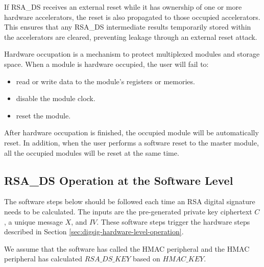 \documentclass[main\_\_EN.tex]{subfiles}
\begin{document}
If RSA\_DS receives an external reset while it has ownership of one or more hardware accelerators, the reset is also propagated to those occupied accelerators. This ensures that any RSA\_DS intermediate results temporarily stored within the accelerators are cleared, preventing leakage through an external reset attack.

\begin{tiplisting}
Hardware occupation is a mechanism to protect multiplexed modules and storage space. When a module is hardware occupied, the user will fail to:
\vspace{-0.5em}
\begin{itemize}
    \item read or write data to the module's registers or memories.
    \item disable the module clock.
    \item reset the module.
\end{itemize}
\vspace{-0.5em}
After hardware occupation is finished, the occupied module will be automatically reset. In addition, when the user performs a software reset to the master module, all the occupied modules will be reset at the same time.
\end{tiplisting}

\subsection{RSA\_DS Operation at the Software Level}

The software steps below should be followed each time an RSA digital signature needs to be calculated. The inputs are the pre-generated private key ciphertext \begin{math}C\end{math}, a unique message \begin{math}X\end{math}, and \begin{math}IV\end{math}. These software steps trigger the hardware steps described in Section \ref{sec:digsig-hardware-level-operation}.

We assume that the software has called the HMAC peripheral and the HMAC peripheral has calculated \begin{math}RSA\_DS\_KEY\end{math} based on \begin{math}HMAC\_KEY\end{math}.
\end{document}
